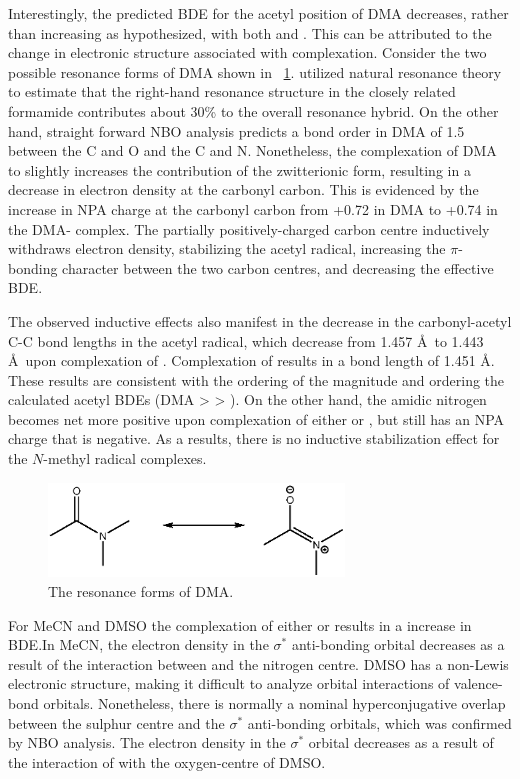 Interestingly, the predicted BDE for the acetyl position of DMA decreases,
rather than increasing as hypothesized, with both  and . This
can be attributed to the change in electronic structure associated with
complexation. Consider the two possible resonance forms of DMA shown in
~\ref{fig:dma-res}. \citet{Hrabal1997} utilized natural resonance theory to
estimate that the right-hand resonance structure in the closely related
formamide contributes about 30\% to the overall resonance hybrid. On the other
hand, straight forward NBO analysis predicts a bond order in DMA of 1.5 between
the C and O and the C and N. Nonetheless, the complexation of DMA to 
slightly increases the contribution of the zwitterionic form, resulting in a
decrease in electron density at the carbonyl carbon. This is evidenced by the
increase in NPA charge at the carbonyl carbon from +0.72 in DMA to +0.74 in the
DMA- complex. The partially positively-charged carbon centre
inductively withdraws electron density, stabilizing the acetyl radical,
increasing the $\pi$-bonding character between the two carbon centres, and
decreasing the effective BDE.

The observed inductive effects also manifest in the decrease in the
carbonyl-acetyl C-C bond lengths in the acetyl radical, which decrease from
1.457 \AA\ to 1.443 \AA\ upon complexation of . Complexation of
 results in a bond length of 1.451 \AA. These results are consistent
with the ordering of the magnitude and ordering the calculated acetyl BDEs (DMA
>  > ). On the other hand, the amidic nitrogen becomes
net more positive upon complexation of either  or , but still
has an NPA charge that is negative. As a results, there is no inductive
stabilization effect for the $N$-methyl radical complexes.

\begin{figure}[!htpb]
  \centering
  \includegraphics[width=0.7\textwidth]{figures/DMA-resonance.eps}
  \caption{The resonance forms of DMA.}
  \label{fig:dma-res}
\end{figure}

For MeCN and DMSO the complexation of either  or  results in a
increase in  BDE.\@ In MeCN, the electron density in the 
$\sigma^*$ anti-bonding orbital decreases as a result of the interaction between
 and the nitrogen centre. DMSO has a non-Lewis electronic structure,
making it difficult to analyze orbital interactions of valence-bond orbitals.
Nonetheless, there is normally a nominal hyperconjugative overlap between the
sulphur centre and the  $\sigma^*$ anti-bonding orbitals, which was
confirmed by NBO analysis. The electron density in the  $\sigma^*$
orbital decreases as a result of the interaction of  with the
oxygen-centre of DMSO.

